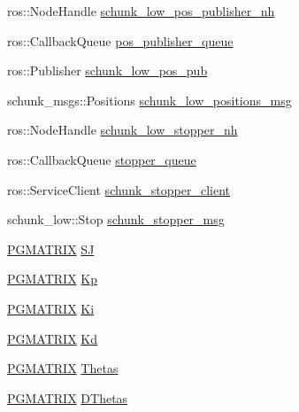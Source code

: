 \begin{DoxyCompactItemize}
\item 
ros\-::\-Node\-Handle \hyperlink{classCartesian__controller_aabe48e7ab08b0235d4cd94213b8faf5d}{schunk\-\_\-low\-\_\-pos\-\_\-publisher\-\_\-nh}
\item 
ros\-::\-Callback\-Queue \hyperlink{classCartesian__controller_adbb9cddf4092cba9042294740c5371eb}{pos\-\_\-publisher\-\_\-queue}
\item 
ros\-::\-Publisher \hyperlink{classCartesian__controller_af06313084ef058d1f979fddeb33d5100}{schunk\-\_\-low\-\_\-pos\-\_\-pub}
\item 
schunk\-\_\-msgs\-::\-Positions \hyperlink{classCartesian__controller_a2dd700542bd6243eef10d34811055584}{schunk\-\_\-low\-\_\-positions\-\_\-msg}
\item 
ros\-::\-Node\-Handle \hyperlink{classCartesian__controller_a57b1869ec960e75e435e1f882a02d80e}{schunk\-\_\-low\-\_\-stopper\-\_\-nh}
\item 
ros\-::\-Callback\-Queue \hyperlink{classCartesian__controller_a52eb090400d8dafaa22aecb037788a66}{stopper\-\_\-queue}
\item 
ros\-::\-Service\-Client \hyperlink{classCartesian__controller_a4ea7350e0f797c49bc51d3433a761aff}{schunk\-\_\-stopper\-\_\-client}
\item 
schunk\-\_\-low\-::\-Stop \hyperlink{classCartesian__controller_a29581ed2f2d8bb97c55e16868bbcc8bd}{schunk\-\_\-stopper\-\_\-msg}
\item 
\hyperlink{gmatrix_8h_ad8edc274a17feb9e4fca93e620253bed}{P\-G\-M\-A\-T\-R\-I\-X} \hyperlink{classCartesian__controller_a98fdac06d136ac3dba0102d97cd5dd36}{S\-J}
\item 
\hyperlink{gmatrix_8h_ad8edc274a17feb9e4fca93e620253bed}{P\-G\-M\-A\-T\-R\-I\-X} \hyperlink{classCartesian__controller_a78073f51064a05d72c41723a93d9079f}{Kp}
\item 
\hyperlink{gmatrix_8h_ad8edc274a17feb9e4fca93e620253bed}{P\-G\-M\-A\-T\-R\-I\-X} \hyperlink{classCartesian__controller_a70e495f39da706f1b589684f58343b9e}{Ki}
\item 
\hyperlink{gmatrix_8h_ad8edc274a17feb9e4fca93e620253bed}{P\-G\-M\-A\-T\-R\-I\-X} \hyperlink{classCartesian__controller_a62394cef8a9a29eac18319a4ad579c4c}{Kd}
\item 
\hyperlink{gmatrix_8h_ad8edc274a17feb9e4fca93e620253bed}{P\-G\-M\-A\-T\-R\-I\-X} \hyperlink{classCartesian__controller_a0a0f818dad601cd9e3e26cb6959b8eb6}{Thetas}
\item 
\hyperlink{gmatrix_8h_ad8edc274a17feb9e4fca93e620253bed}{P\-G\-M\-A\-T\-R\-I\-X} \hyperlink{classCartesian__controller_a5d6419e62e130150edfcbd82b1dadcae}{D\-Thetas}

\end{DoxyCompactItemize}
